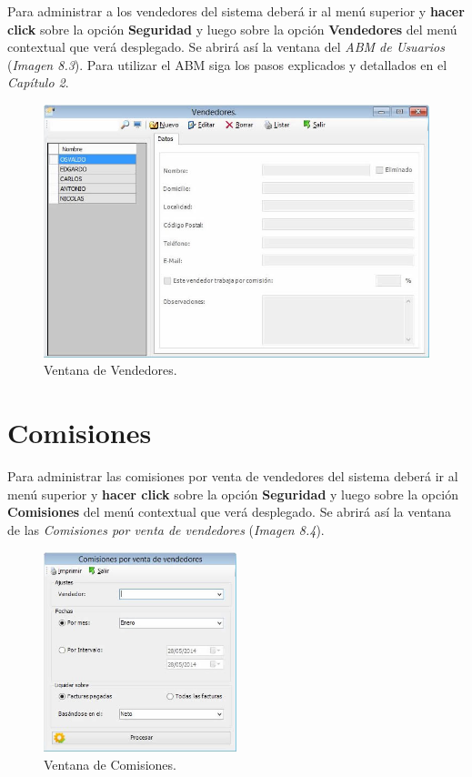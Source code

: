 \documentclass{book}
\begin{document}
Para administrar a los vendedores del sistema deberá ir al menú superior y \textbf{hacer click} sobre la opción \textbf{Seguridad} y luego sobre la opción \textbf{Vendedores} del menú contextual que verá desplegado. Se abrirá así la ventana del \textit{ABM de Usuarios} (\textit{Imagen 8.3}). 
Para utilizar el ABM siga los pasos explicados y detallados en el \textit{Capítulo 2}.
\smallskip
\newpage

\begin{figure}[H]
	\centering
	\includegraphics[width=1.0\textwidth]{images/ventanas/ventana-21.jpg}
	\caption{Ventana de Vendedores.}
	\medskip
\end{figure}


\section{Comisiones}

Para administrar las comisiones por venta de vendedores del sistema deberá ir al menú superior y \textbf{hacer click} sobre la opción \textbf{Seguridad} y luego sobre la opción \textbf{Comisiones} del menú contextual que verá desplegado. Se abrirá así la ventana de las \textit{Comisiones por venta de vendedores} (\textit{Imagen 8.4}).
\bigskip\bigskip


\begin{figure}[H]
	\centering
	\includegraphics[width=0.5\textwidth]{images/ventanas/ventana-22.jpg}
	\caption{Ventana de Comisiones.}
	\medskip
\end{figure}
\bigskip
\end{document}
